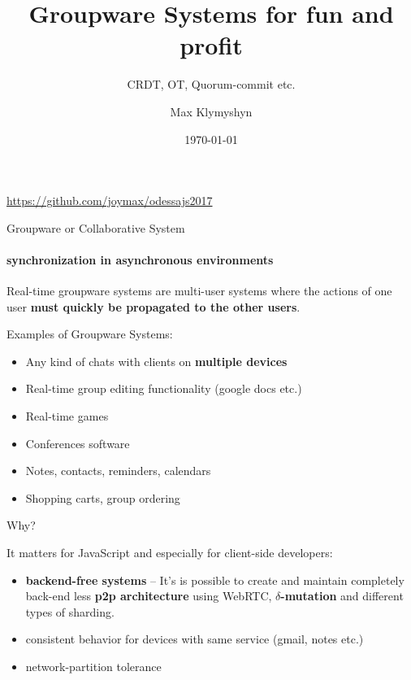 \documentclass{beamer}
\title{Groupware Systems for fun and profit}
\subtitle{CRDT, OT, Quorum-commit etc.} %
\author{Max Klymyshyn}
\date{\today}
\begin{document}
\begin{frame}
\titlepage

\center
\small
\href{https://github.com/joymax/odessajs2017}{https://github.com/joymax/odessajs2017}

\end{frame}


\begin{frame}{Groupware or Collaborative System}
\framesubtitle{synchronization in asynchronous environments}


\begin{block}{}
Real-time groupware systems are multi-user systems
where the actions of one user 
\textbf{must quickly be propagated to the other users}.
\end{block}

\vspace{0.5cm}
Examples of Groupware Systems:


\begin{itemize}
\item Any kind of chats with clients on \textbf{multiple devices}
\item Real-time group editing functionality (google docs etc.)
\item Real-time games
\item Conferences software
\item Notes, contacts, reminders, calendars
\item Shopping carts, group ordering
\end{itemize}

\end{frame}


\begin{frame}{Why?}

It matters for JavaScript and especially for client-side developers:
\vspace{1cm}
\begin{itemize}
	\item \textbf{backend-free systems} – It's is possible to create and maintain completely back-end less \textbf{p2p architecture} using WebRTC, \textbf{$\delta$-mutation} and different types of sharding.
	\item consistent behavior for devices with same service (gmail, notes etc.)
	\item network-partition tolerance
\end{itemize}
\end{frame}
\end{document}
